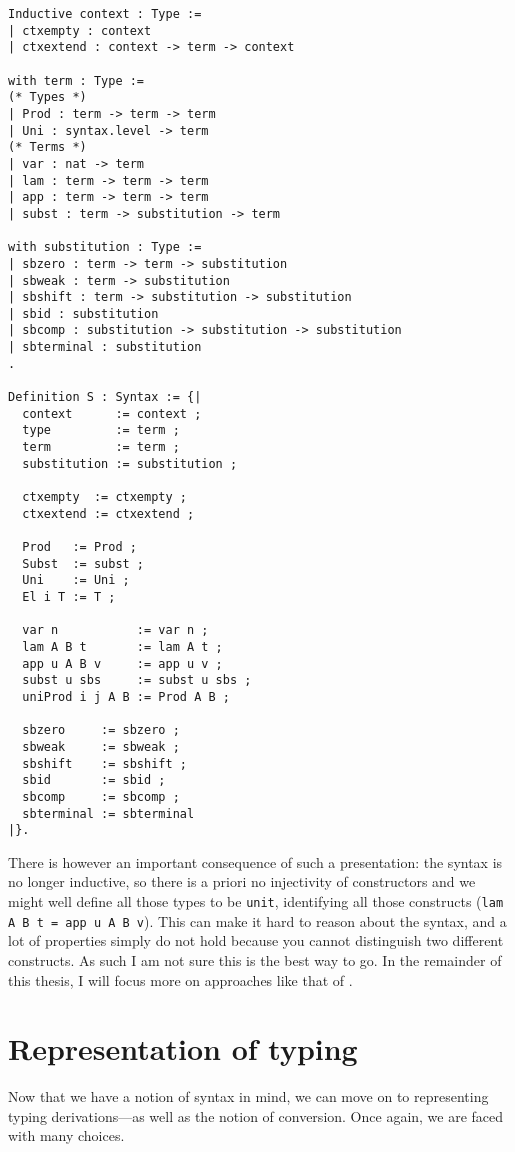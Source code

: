 \begin{verbatim}
Inductive context : Type :=
| ctxempty : context
| ctxextend : context -> term -> context

with term : Type :=
(* Types *)
| Prod : term -> term -> term
| Uni : syntax.level -> term
(* Terms *)
| var : nat -> term
| lam : term -> term -> term
| app : term -> term -> term
| subst : term -> substitution -> term

with substitution : Type :=
| sbzero : term -> term -> substitution
| sbweak : term -> substitution
| sbshift : term -> substitution -> substitution
| sbid : substitution
| sbcomp : substitution -> substitution -> substitution
| sbterminal : substitution
.

Definition S : Syntax := {|
  context      := context ;
  type         := term ;
  term         := term ;
  substitution := substitution ;

  ctxempty  := ctxempty ;
  ctxextend := ctxextend ;

  Prod   := Prod ;
  Subst  := subst ;
  Uni    := Uni ;
  El i T := T ;

  var n           := var n ;
  lam A B t       := lam A t ;
  app u A B v     := app u v ;
  subst u sbs     := subst u sbs ;
  uniProd i j A B := Prod A B ;

  sbzero     := sbzero ;
  sbweak     := sbweak ;
  sbshift    := sbshift ;
  sbid       := sbid ;
  sbcomp     := sbcomp ;
  sbterminal := sbterminal
|}.

\end{verbatim}

There is however an important consequence of such a presentation: the syntax is
no longer inductive, so there is a priori no injectivity of constructors and
we might well define all those types to be \texttt{unit}, identifying
all those constructs (\eg \texttt{lam A B t = app u A B v}).
This can make it hard to reason about the syntax, and a lot of properties simply
do not hold because you cannot distinguish two different constructs.
As such I am not sure this is the best way to go.
In the remainder of this thesis, I will focus more on approaches like that of
\MetaCoq.

\section{Representation of typing}

Now that we have a notion of syntax in mind, we can move on to representing
typing derivations---as well as the notion of conversion.
Once again, we are faced with many choices.

